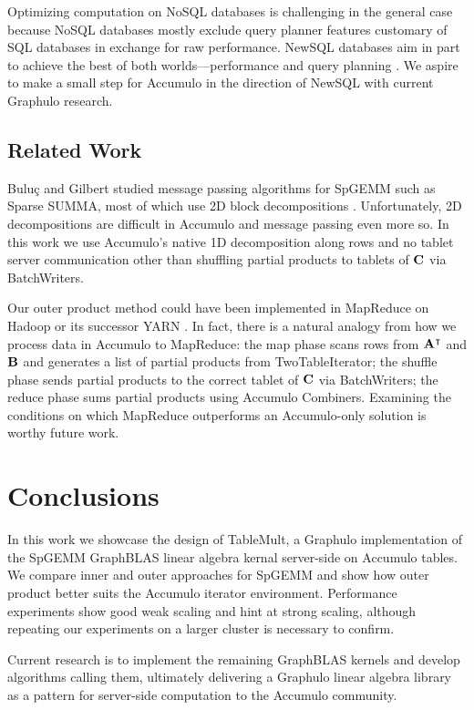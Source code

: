 Optimizing computation on NoSQL databases is challenging in the general case because
NoSQL databases mostly exclude query planner features 
customary of SQL databases in exchange for raw performance.
NewSQL databases aim in part to achieve the best of both worlds---performance and query planning \cite{grolinger2013data}.
We aspire to make a small step for Accumulo in the direction of NewSQL with current Graphulo research.



\subsection{Related Work} %
Bulu\c{c} and Gilbert studied message passing algorithms for SpGEMM
such as Sparse SUMMA, most of which use 2D block decompositions \cite{buluc2012parallel}.
Unfortunately, 2D decompositions are difficult in Accumulo 
and message passing even more so.
In this work we use Accumulo's native 1D decomposition along rows 
and no tablet server communication
other than shuffling partial products to tablets of $\mathbf{C}$ via BatchWriters.


Our outer product method could have been implemented in MapReduce %
on Hadoop or its successor YARN \cite{vavilapalli2013apache}.
In fact, there is a natural analogy from how we process data in Accumulo to MapReduce:
the map phase scans rows from $\mathbf{A^{\intercal}}$ and $\mathbf{B}$
and generates a list of partial products from TwoTableIterator;
the shuffle phase sends partial products to the correct tablet of $\mathbf{C}$ via BatchWriters;
the reduce phase sums partial products using Accumulo Combiners.
Examining the conditions on which MapReduce outperforms an Accumulo-only solution
is worthy future work.




\section{Conclusions}
\label{sConclusions}

In this work we showcase the design of TableMult, a Graphulo implementation of the 
SpGEMM GraphBLAS linear algebra kernal server-side on Accumulo tables.
We compare inner and outer approaches for SpGEMM and show how outer product 
better suits the Accumulo iterator environment.
Performance experiments show good weak scaling and hint at strong scaling,
although repeating our experiments on a larger cluster is necessary to confirm.

Current research is to implement the remaining GraphBLAS kernels 
and develop algorithms calling them, %
ultimately delivering a Graphulo linear algebra library 
as a pattern for server-side computation
to the Accumulo community.
